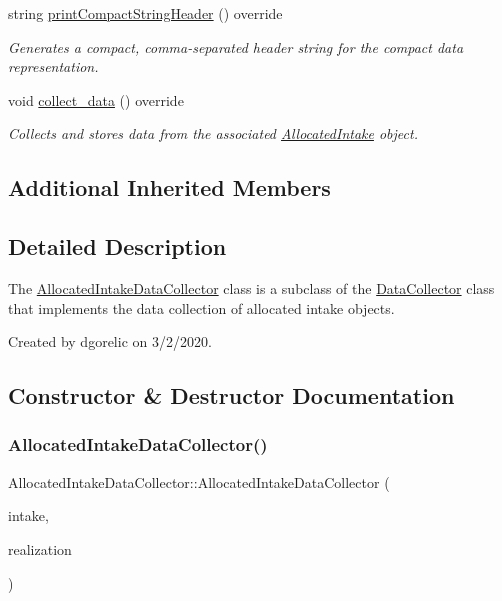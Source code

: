 \begin{DoxyCompactItemize}
string \mbox{\hyperlink{classAllocatedIntakeDataCollector_a995c69f6e2fe615786b2b26fd349c6cb}{print\+Compact\+String\+Header}} () override
\begin{DoxyCompactList}\small\item\em Generates a compact, comma-\/separated header string for the compact data representation. \end{DoxyCompactList}\item 
void \mbox{\hyperlink{classAllocatedIntakeDataCollector_a06906344679fed5e3d24352e98107537}{collect\+\_\+data}} () override
\begin{DoxyCompactList}\small\item\em Collects and stores data from the associated \mbox{\hyperlink{classAllocatedIntake}{Allocated\+Intake}} object. \end{DoxyCompactList}\end{DoxyCompactItemize}
\subsection*{Additional Inherited Members}


\subsection{Detailed Description}
The {\ttfamily \mbox{\hyperlink{classAllocatedIntakeDataCollector}{Allocated\+Intake\+Data\+Collector}}} class is a subclass of the {\ttfamily \mbox{\hyperlink{classDataCollector}{Data\+Collector}}} class that implements the data collection of allocated intake objects. 

Created by dgorelic on 3/2/2020. 

\subsection{Constructor \& Destructor Documentation}
\mbox{\label{classAllocatedIntakeDataCollector_a9b8eb277ad491771e9c2634c6fd3e11c}} 
\subsubsection{\texorpdfstring{Allocated\+Intake\+Data\+Collector()}{AllocatedIntakeDataCollector()}}
{\footnotesize\ttfamily Allocated\+Intake\+Data\+Collector\+::\+Allocated\+Intake\+Data\+Collector (\begin{DoxyParamCaption}\item[{\mbox{\hyperlink{classAllocatedIntake}{Allocated\+Intake}} $\ast$}]{intake,  }\item[{unsigned long}]{realization }\end{DoxyParamCaption})}



